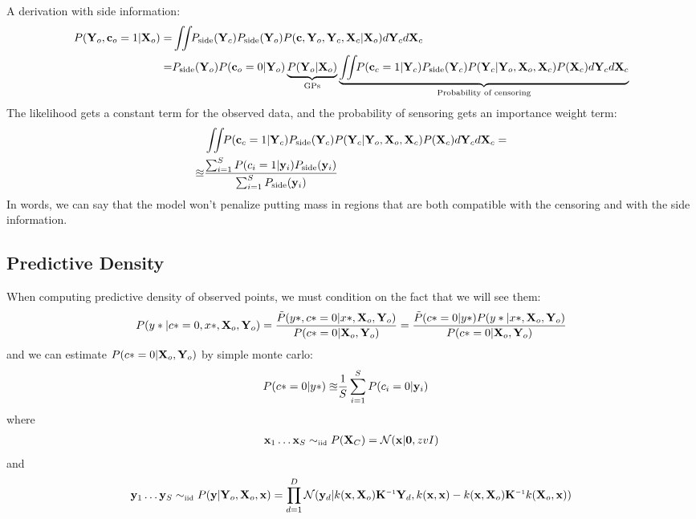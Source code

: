 \documentclass{article}
\begin{document}
A derivation with side information:
%
\begin{align}
P(\vY_o, \vc_o = 1 | \vX_o) = & \intlatent P_{\textrm{side}}(\vY_c) P_{\textrm{side}}(\vY_o) P( \vc, \vY_o, \vY_c, \vX_c | \vX_o ) d\vY_c d\vX_c \\
= & P_{\textrm{side}}(\vY_o) P( \vc_o = 0 | \vY_o ) \underbrace{P( \vY_o | \vX_o )}_{\textrm{GPs}} \underbrace{\intlatent P( \vc_c = 1 | \vY_c ) P_{\textrm{side}}(\vY_c) P( \vY_c | \vY_o, \vX_o, \vX_c) P(\vX_c) d\vY_c d\vX_c }_{\textrm{Probability of censoring}}
\label{eqn:full_censoring_likelihood}
\end{align}
%
The likelihood gets a constant term for the observed data, and the probability of sensoring gets an importance weight term:
%
\begin{align}
& \int \!\!\! \int \!\! P( {\bf{c}}_c = 1 | \mathbf{Y}_c )  P_{\textrm{side}}(\mathbf{Y}_c) P( \mathbf{Y}_c | \mathbf{Y}_o, \mathbf{X}_o, \mathbf{X}_c) P(\mathbf{X}_c) d\mathbf{Y}_c d\mathbf{X}_c = \\
\approxeq & \frac{ \sum_{i=1}^S P(c_i = 1 | {\bf{y}}_i ) P_{\textrm{side}}({\bf{y}}_i) }{  \sum_{i=1}^S P_{\textrm{side}}({\bf{y}}_i)}
\label{eqn:approx-prob-censoring}
\end{align}
%
In words, we can say that the model won't penalize putting mass in regions that are both compatible with the censoring and with the side information.

\subsection{Predictive Density}

When computing predictive density of observed points, we must condition on the fact that we will see them:
%
\begin{align}
P(y* |c* = 0, x*, \mathbf{X}_o, \mathbf{Y}_o ) = \frac{\tilde{P}(y*, c* = 0 | x*, \mathbf{X}_o, \mathbf{Y}_o )}{ P(c* = 0 | \mathbf{X}_o, \mathbf{Y}_o)}
= \frac{\tilde{P}(c* = 0 | y* ) P(y* | x*, \mathbf{X}_o, \mathbf{Y}_o )}{ P(c* = 0 | \mathbf{X}_o, \mathbf{Y}_o)}
\end{align}
%
and we can estimate $P(c* = 0 | \mathbf{X}_o, \mathbf{Y}_o )$ by simple monte carlo:
%
\begin{align}
P(c* = 0 | y* ) \approxeq & \frac{1}{S} \sum_{i=1}^S P(c_i = 0 | {\bf{y}}_i )
\end{align}
%
where
%
\begin{align}
  \vx_1 \dots \vx_S \simiid P( \vX_C ) = \N{\vx}{ \vzero}{ zvI }
\end{align}
%
and
%
\begin{align}
 \vy_1 \dots \vy_S \simiid P(\vy | \vY_o, \vX_o, \vx) = \prod_{d=1}^D \N{\vy_d}{k(\vx, \vX_o) \vK\inv \vY_d}{k(\vx, \vx) - k(\vx, \vX_o) \vK\inv k(\vX_o, \vx)}
\end{align}
\end{document}
